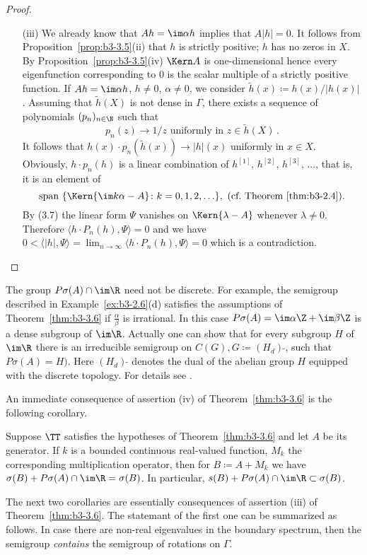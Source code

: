 \begin{proof}
\begin{enumerate}[wide]
	\item[(iii)] 
	We already know that $Ah = \im\alpha h$ implies that $A|h| = 0$.
	It follows from Proposition~\ref{prop:b3-3.5}(ii) that $h$ is strictly positive; \ie $h$ has no zeros in $X$.
	By Proposition~\ref{prop:b3-3.5}(iv) $\Kern A$ is one-dimensional hence every
%
%
	eigenfunction corresponding to $0$ is the scalar multiple of a strictly positive function.
	If $Ah = \im\alpha h$, $h \neq 0$, $\alpha \neq 0$, we consider $\tilde{h}(x) \coloneq h(x)/|h(x)|$.
	Assuming that $\tilde{h}(X)$ is not dense in $\Gamma$, there exists a sequence of polynomials $(p_{n})_{n\in\N}$ such that
	\begin{equation}\label{eq:b3-3.8}
		p_{n}(z) \to 1/z \text{ uniformly in } z \in \tilde{h}(X)\,.
	\end{equation}
	It follows that $h(x)\cdot p_{n}(\tilde{h}(x)) \to |h|(x)$ uniformly in $x \in X$.
	Obviously, $h\cdot p_{n}(h)$ is a linear combination of $h^{[1]}$, $h^{[2]}$, $h^{[3]}$, ..., that is, it is an element of
	\[
	\text{span $\{\Kern{ \im k\alpha - A} \colon  k=0,1,2,\ldots \}$}, \  \text{(cf.\ Theorem~\ref{thm:b3-2.4})}.
	\]
	By (3.7) the linear form $\Psi$ vanishes on $\Kern{\lambda - A}$ whenever $\lambda \neq 0$.
	Therefore $\langle h\cdot P_{n}(h),\Psi\rangle = 0$ and we have $0 < \langle|h|,\Psi\rangle = \lim_{n\to\infty}\langle h\cdot P_{n}(h),\Psi\rangle = 0$ which is a contradiction.
	\end{enumerate}
\end{proof}
The group $P\sigma(A) \cap \im\R$ need not be discrete. For example, the semigroup described in Example~\ref{ex:b3-2.6}(d) satisfies the assumptions of Theorem~\ref{thm:b3-3.6} if $\frac{\alpha}{\beta}$ is irrational. In this case $P\sigma(A) = \im\alpha \Z + \im\beta \Z$ is a dense subgroup of $\im \R$. Actually one can show that for every subgroup $H$ of $\im \R$ there is an irreducible semigroup on $C(G), G \coloneqq (H_d)\,{\tilde{ }}$, such that 
$P\sigma(A) = H)$. Here $(H_d)\,{\tilde{ }}$ denotes the dual of the abelian group $H$ equipped with the discrete topology. For details see \citet[p.62]{greiner:1982}. 

An immediate consequence of assertion (iv) of Theorem~\ref{thm:b3-3.6} is the following corollary. 
\begin{corollary}\label{cor:b3-3.7}
Suppose $\TT$ satisfies the hypotheses of Theorem~\ref{thm:b3-3.6} and let $A$ be its generator.
If $k$ is a bounded continuous real-valued function, $M_{k}$ the corresponding multiplication operator, then for $B \coloneq A + M_{k}$ we have $\sigma(B) + P\sigma(A)\cap \im\R = \sigma(B)$.
In particular, $s(B) + P\sigma(A)\cap \im\R \subset \sigma(B)$.
\end{corollary}
The next two corollaries are essentially consequences of assertion (iii) of Theorem~\ref{thm:b3-3.6}. 
The statemant of the first one can be summarized as follows. 
In case there are non-real eigenvalues in the boundary spectrum, then 
the semigroup \emph{contains} the semigroup of rotations on $\Gamma$.


